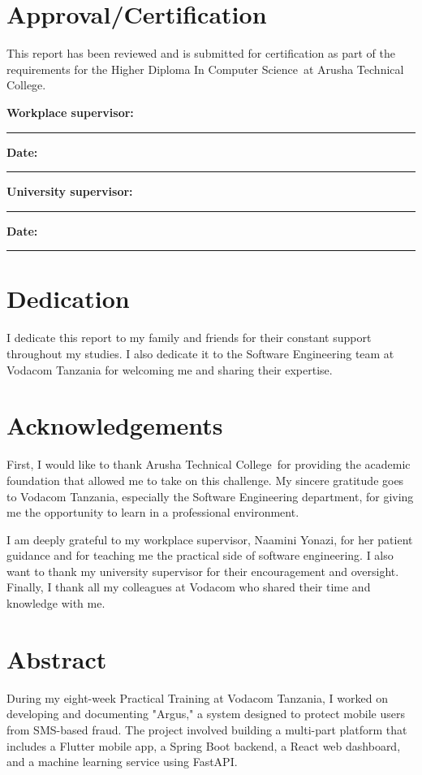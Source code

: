 \documentclass[12pt,a4paper,oneside]{report}
\newcommand{\UniversityName}{Arusha Technical College}
\newcommand{\ProgrammeName}{Higher Diploma In Computer Science}
\begin{document}
\chapter*{Approval/Certification}
This report has been reviewed and is submitted for certification as part of the requirements for the \ProgrammeName\ at \UniversityName.

\vspace{15mm}
\noindent\textbf{Workplace supervisor:} \rule{55mm}{0.4pt}\hfill
\textbf{Date:} \rule{30mm}{0.4pt}

\vspace{10mm}
\noindent\textbf{University supervisor:} \rule{55mm}{0.4pt}\hfill
\textbf{Date:} \rule{30mm}{0.4pt}

\chapter*{Dedication}
I dedicate this report to my family and friends for their constant support throughout my studies. I also dedicate it to the Software Engineering team at Vodacom Tanzania for welcoming me and sharing their expertise.

\chapter*{Acknowledgements}
First, I would like to thank \UniversityName\ for providing the academic foundation that allowed me to take on this challenge. My sincere gratitude goes to Vodacom Tanzania, especially the Software Engineering department, for giving me the opportunity to learn in a professional environment.

I am deeply grateful to my workplace supervisor, Naamini Yonazi, for her patient guidance and for teaching me the practical side of software engineering. I also want to thank my university supervisor for their encouragement and oversight. Finally, I thank all my colleagues at Vodacom who shared their time and knowledge with me.

\chapter*{Abstract}
During my eight-week Practical Training at Vodacom Tanzania, I worked on developing and documenting "Argus," a system designed to protect mobile users from SMS-based fraud. The project involved building a multi-part platform that includes a Flutter mobile app, a Spring Boot backend, a React web dashboard, and a machine learning service using FastAPI.
\end{document}
